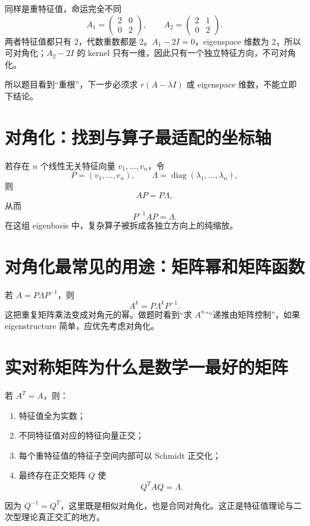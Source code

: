 \documentclass[11pt,a4paper,openany]{ctexbook}
\begin{document}
\begin{examplebox}{同样是重特征值，命运完全不同}
\[
A_1=\begin{pmatrix}2&0\\0&2\end{pmatrix},\qquad
A_2=\begin{pmatrix}2&1\\0&2\end{pmatrix}.
\]
两者特征值都只有 $2$，代数重数都是 2。$A_1-2I=0$，eigenspace 维数为 2，所以可对角化；$A_2-2I$ 的 kernel 只有一维，因此只有一个独立特征方向，不可对角化。

所以题目看到“重根”，下一步必须求 $r(A-\lambda I)$ 或 eigenspace 维数，不能立即下结论。
\end{examplebox}

\section{对角化：找到与算子最适配的坐标轴}
若存在 $n$ 个线性无关特征向量 $v_1,\dots,v_n$，令
\[
P=(v_1,\dots,v_n),\qquad \Lambda=\operatorname{diag}(\lambda_1,\dots,\lambda_n),
\]
则
\[
AP=P\Lambda,
\]
从而
\[
\boxed{P^{-1}AP=\Lambda}.
\]
在这组 eigenbasis 中，复杂算子被拆成各独立方向上的纯缩放。

\section{对角化最常见的用途：矩阵幂和矩阵函数}
若 $A=P\Lambda P^{-1}$，则
\[
A^k=P\Lambda^kP^{-1}.
\]
这把重复矩阵乘法变成对角元的幂。做题时看到“求 $A^n$”“递推由矩阵控制”，如果 eigenstructure 简单，应优先考虑对角化。

\section{实对称矩阵为什么是数学一最好的矩阵}
若 $A^T=A$，则：
\begin{enumerate}
  \item 特征值全为实数；
  \item 不同特征值对应的特征向量正交；
  \item 每个重特征值的特征子空间内部可以 Schmidt 正交化；
  \item 最终存在正交矩阵 $Q$ 使
  \[
  \boxed{Q^TAQ=\Lambda}.
  \]
\end{enumerate}
因为 $Q^{-1}=Q^T$，这里既是相似对角化，也是合同对角化。这正是特征值理论与二次型理论真正交汇的地方。
\end{document}
